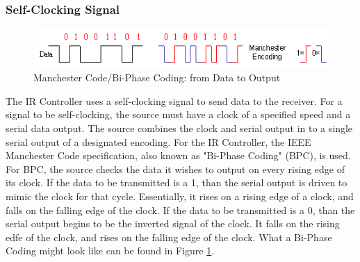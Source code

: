 \documentclass[]{article}
\begin{document}
\subsubsection{Self-Clocking Signal}
\begin{figure}[H]\centering
    \includegraphics[width=\linewidth]{figures/Manchester_Code.png}
    \caption{Manchester Code/Bi-Phase Coding: from Data to Output\cite{manchesterCode}} 
    \label{fig:biPhaseExample}
\end{figure}
\label{subsubsec:selfClockingSignal}
The IR Controller uses a self-clocking signal to send data to the receiver.
For a signal to be self-clocking, the source must have a clock of a specified speed and a serial data output.
The source combines the clock and serial output in to a single serial output of a designated encoding.
For the IR Controller, the IEEE Manchester Code specification, also known as "Bi-Phase Coding" (BPC), is used.
For BPC, the source checks the data it wishes to output on every rising edge of its clock.
If the data to be transmitted is a 1, than the serial output is driven to mimic the clock for that cycle.
Essentially, it rises on a rising edge of a clock, and falls on the falling edge of the clock.
If the data to be transmitted is a 0, than the serial output begins to be the inverted signal of the clock.
It falls on the rising edfe of the clock, and rises on the falling edge of the clock. 
What a Bi-Phase Coding might look like can be found in Figure \ref{fig:biPhaseExample}.
\end{document}
